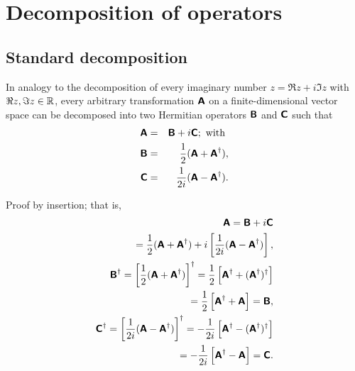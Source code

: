 \section{Decomposition of operators}

\subsection{Standard decomposition}

In analogy to the decomposition of every imaginary number $z= \Re z +i \Im z$ with $\Re z,\Im z\in {\Bbb R}$,
every arbitrary transformation $\textsf{\textbf{A}}$ on a finite-dimensional vector space can be decomposed into two Hermitian operators
$\textsf{\textbf{B}}$
and
$\textsf{\textbf{C}}$
such that
\begin{eqnarray}
\textsf{\textbf{A}}&=&\textsf{\textbf{B}} + i \textsf{\textbf{C}}; \textrm{ with }  \nonumber \\
\textsf{\textbf{B}}&=&\frac{1}{2}(\textsf{\textbf{A}} +   \textsf{\textbf{A}}^\dagger ), \\
\textsf{\textbf{C}}&=&\frac{1}{2i}(\textsf{\textbf{A}} -   \textsf{\textbf{A}}^\dagger )\nonumber .
\end{eqnarray}

{\color{OliveGreen}
\bproof
Proof by insertion; that is,
\begin{equation}
\begin{split}
\textsf{\textbf{A}}=\textsf{\textbf{B}} + i \textsf{\textbf{C}}\\
\quad =
\frac{1}{2}(\textsf{\textbf{A}} +   \textsf{\textbf{A}}^\dagger ) + i \left[\frac{1}{2i}(\textsf{\textbf{A}} -   \textsf{\textbf{A}}^\dagger )\right],
\\
\textsf{\textbf{B}}^\dagger=   \left[\frac{1}{2}(\textsf{\textbf{A}} +   \textsf{\textbf{A}}^\dagger )\right]^\dagger
  =    \frac{1}{2}\left[\textsf{\textbf{A}}^\dagger +  ( \textsf{\textbf{A}}^\dagger )^\dagger \right]\\
 =    \frac{1}{2}\left[\textsf{\textbf{A}}^\dagger +    \textsf{\textbf{A}} \right]
 =  \textsf{\textbf{B}} , \\
\textsf{\textbf{C}}^\dagger=   \left[\frac{1}{2i}(\textsf{\textbf{A}} -   \textsf{\textbf{A}}^\dagger )\right]^\dagger
 =   -\frac{1}{2i}\left[\textsf{\textbf{A}}^\dagger -  ( \textsf{\textbf{A}}^\dagger )^\dagger \right]\\
  =   -\frac{1}{2i}\left[\textsf{\textbf{A}}^\dagger -    \textsf{\textbf{A}}\right]
 =  \textsf{\textbf{C}} .
\end{split}
\end{equation}
\eproof
}


